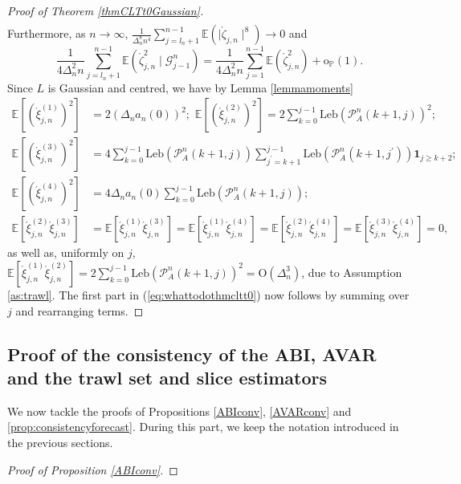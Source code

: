 \documentclass{article}
\theoremstyle{plain}
\theoremstyle{definition}
\theoremstyle{remark}
\newcommand{\Leb}{\ensuremath{\mathrm{Leb}}}
\begin{document}
\begin{appendix}
\begin{proof}[Proof of Theorem \ref{thmCLTt0Gaussian}]
\[\begin{aligned}
	\end{aligned}
	\]
	Furthermore, as $n\rightarrow\infty$, $\frac{1}{\Delta_{n}^{8}n^{4}}\sum_{j=l_{n}+1}^{n-1}\mathbb{E}(\mid\acute{\zeta}_{j,n}\mid^{8})\rightarrow0$
	and
	\[
	\frac{1}{4\Delta_{n}^{2}n}\sum_{j=l_{n}+1}^{n-1}\mathbb{E}(\acute{\zeta}_{j,n}^{2}\mid\mathscr{G}_{j-1}^{n})=\frac{1}{4\Delta_{n}^{2}n}\sum_{j=1}^{n-1}\mathbb{E}(\acute{\zeta}_{j,n}^{2})+\mathrm{o}_{\mathbb{P}}(1).
	\]
	Since $L$ is Gaussian and centred, we have by Lemma \ref{lemmamoments}
	\begin{align*}
		\mathbb{E}[(\acute{\xi}_{j,n}^{(1)})^{2}] & =2(\Delta_{n}a_{n}(0))^{2};\,\,\mathbb{E}[(\acute{\xi}_{j,n}^{(2)})^{2}]=2\sum_{k=0}^{j-1}\Leb(\mathcal{P}_{A}^{n}(k+1,j))^{2};\\
		\mathbb{E}[(\acute{\xi}_{j,n}^{(3)})^{2}] & =4\sum_{k=0}^{j-1}\Leb(\mathcal{P}_{A}^{n}(k+1,j))\sum_{j^{\prime}=k+1}^{j-1}\Leb(\mathcal{P}_{A}^{n}(k+1,j^{\prime}))\mathbf{1}_{j\geq k+2};\\
		\mathbb{E}[(\acute{\xi}_{j,n}^{(4)})^{2}] & =4\Delta_{n}a_{n}(0)\sum_{k=0}^{j-1}\Leb(\mathcal{P}_{A}^{n}(k+1,j));\\
		\mathbb{E}[\acute{\xi}_{j,n}^{(2)}\acute{\xi}_{j,n}^{(3)}] & =\mathbb{E}[\acute{\xi}_{j,n}^{(1)}\acute{\xi}_{j,n}^{(3)}]=\mathbb{E}[\acute{\xi}_{j,n}^{(1)}\acute{\xi}_{j,n}^{(4)}]=\mathbb{E}[\acute{\xi}_{j,n}^{(2)}\acute{\xi}_{j,n}^{(4)}]=\mathbb{E}[\acute{\xi}_{j,n}^{(3)}\acute{\xi}_{j,n}^{(4)}]=0,
	\end{align*}
	as well as, uniformly on $j$, $\mathbb{E}[\acute{\xi}_{j,n}^{(1)}\acute{\xi}_{j,n}^{(2)}]=2\sum_{k=0}^{j-1}\Leb(\mathcal{P}_{A}^{n}(k+1,j))^{2}=\mathrm{O}(\Delta_{n}^{3})$,
	due to Assumption \ref{as:trawl}. The first part in (\ref{eq:whattodothmcltt0})
	now follows by summing over $j$ and rearranging terms.\end{proof}

\subsection{Proof of the consistency of the ABI, AVAR and the trawl set and slice estimators}
We now tackle the proofs of Propositions \ref{ABIconv}, \ref{AVARconv} and \ref{prop:consistencyforecast}.
During this part, we keep the notation introduced in the previous
sections. 

\begin{proof}[Proof of Proposition \ref{ABIconv}]
	

\end{proof}
\end{appendix}
\end{document}
